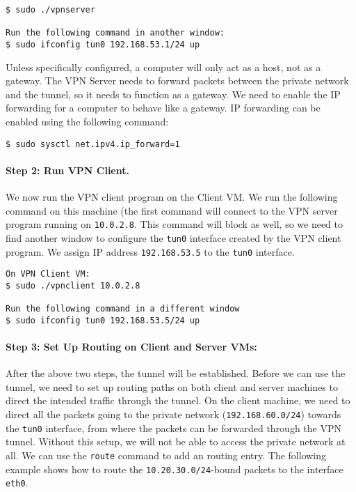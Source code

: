 \begin{lstlisting}
$ sudo ./vpnserver

Run the following command in another window:
$ sudo ifconfig tun0 192.168.53.1/24 up
\end{lstlisting}

Unless specifically configured, a computer will only act as a host, 
not as a gateway. The VPN Server needs to forward packets between the private network and the 
tunnel, so it needs to function as a gateway. We need to  
enable the IP forwarding for a computer to behave like a gateway. 
IP forwarding can be enabled
using the following command:

\begin{lstlisting}
$ sudo sysctl net.ipv4.ip_forward=1
\end{lstlisting}



\paragraph{Step 2: Run VPN Client.} We now run the VPN client program on the Client
VM.  We run the following command on this machine (the first command
will connect to the VPN server program running on {\tt 10.0.2.8}.
This command will block as well, so we need to find another window to 
configure the \texttt{tun0} interface created by the VPN client program.  
We assign IP address \texttt{192.168.53.5} to the \texttt{tun0} interface.   


\begin{lstlisting}
On VPN Client VM:
$ sudo ./vpnclient 10.0.2.8

Run the following command in a different window
$ sudo ifconfig tun0 192.168.53.5/24 up
\end{lstlisting}



\paragraph{Step 3: Set Up Routing on Client and Server VMs:} 
After the above two steps, the tunnel will be established. 
Before we can use the tunnel, we need to set up routing 
paths on both client and server machines to direct the intended traffic through
the tunnel. On the client machine, we need to direct all the packets going
to the private network ({\tt 192.168.60.0/24}) towards the \texttt{tun0}
interface, from where the packets can be forwarded through the VPN tunnel.
Without this setup, we will not be able to access the private network at
all. We can use the \texttt{route} command to add an routing entry. The
following example shows how to route the \texttt{10.20.30.0/24}-bound
packets to the interface \texttt{eth0}. 

